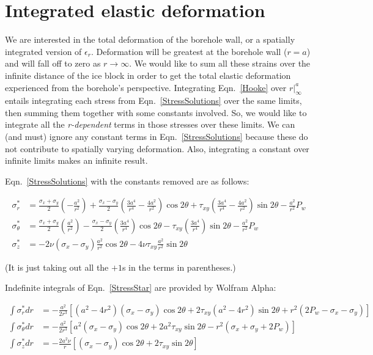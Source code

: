 \documentclass[11pt]{article}
\begin{document}
\section*{Integrated elastic deformation}

We are interested in the total deformation of the borehole wall, or a spatially integrated version of $\epsilon_r$.  Deformation will be greatest at the borehole wall ($r=a$) and will fall off to zero as $r \rightarrow \infty$.  We would like to sum all these strains over the infinite distance of the ice block in order to get the total elastic deformation experienced from the borehole's perspective.  Integrating Eqn.~\ref{Hooke} over $r|_\infty^a$ entails integrating each stress from Eqn.~\ref{StressSolutions} over the same limits, then summing them together with some constants involved.  So, we would like to integrate all the \textit{r-dependent} terms in those stresses over these limits.  We can (and must) ignore any constant terms in Eqn.~\ref{StressSolutions} because these do not contribute to spatially varying deformation.  Also, integrating a constant over infinite limits makes an infinite result.

Eqn.~\ref{StressSolutions} with the constants removed are as follows:

\begin{equation}
	\begin{aligned}
	\sigma^*_r &= \frac{\sigma_x+\sigma_y}{2}\left(-\frac{a^2}{r^2}\right) + \frac{\sigma_x-\sigma_y}{2}\left(\frac{3a^4}{r^4}-\frac{4a^2}{r^2}\right) \cos2\theta + \tau_{xy}\left(\frac{3a^4}{r^4}-\frac{4a^2}{r^2}\right)\sin2\theta - \frac{a^2}{r^2}P_w \\
	\sigma^*_\theta &= \frac{\sigma_x+\sigma_y}{2}\left(\frac{a^2}{r^2}\right) - \frac{\sigma_x-\sigma_y}{2}\left(\frac{3a^4}{r^4}\right) \cos2\theta - \tau_{xy}\left(\frac{3a^4}{r^4}\right)\sin2\theta - \frac{a^2}{r^2}P_w \\
	\sigma^*_z &= -2\nu\left(\sigma_x-\sigma_y\right)\frac{a^2}{r^2}\cos2\theta - 4\nu\tau_{xy}\frac{a^2}{r^2}\sin2\theta
	\end{aligned}
\label{StressStar}
\end{equation}

\noindent (It is just taking out all the $+1$s in the terms in parentheses.)

Indefinite integrals of Eqn.~\ref{StressStar} are provided by Wolfram Alpha:

\begin{equation}
	\begin{aligned}
	\int \sigma^*_r dr &= -\frac{a^2}{2r^3}\left[\left(a^2-4r^2\right)\left(\sigma_x-\sigma_y\right)\cos2\theta + 2\tau_{xy}\left(a^2-4r^2\right)\sin2\theta+r^2\left(2P_w-\sigma_x-\sigma_y\right)\right] \\
	\int \sigma^*_\theta dr &= -\frac{a^2}{2r^3}\left[a^2\left(\sigma_x-\sigma_y\right)\cos2\theta+2a^2\tau_{xy}\sin2\theta-r^2\left(\sigma_x+\sigma_y+2P_w\right)  \right] \\
	\int \sigma^*_z dr &= -\frac{2a^2\nu}{r}\left[\left(\sigma_x-\sigma_y\right)\cos2\theta+2\tau_{xy}\sin2\theta\right]
	\end{aligned}
\label{IndefInt}
\end{equation}
\end{document}
